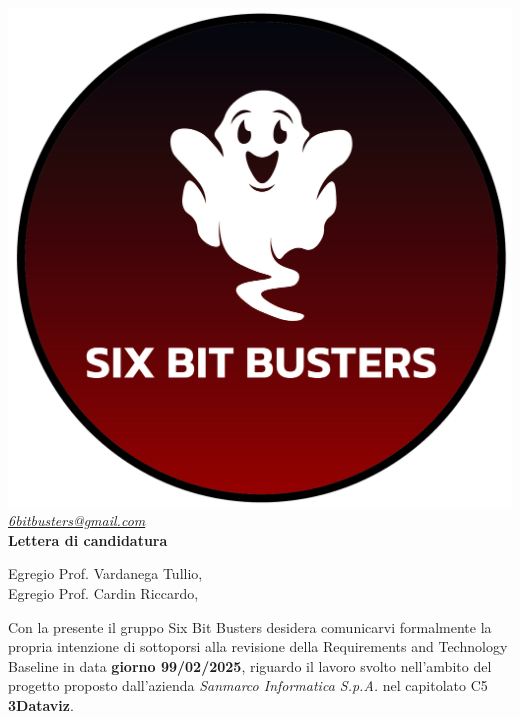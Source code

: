 \thispagestyle{empty}
\renewcommand{\arraystretch}{1.0}


\begin{titlepage}
	\begin{center}
	    
	
		
	\includegraphics[scale = 0.5]{template/images/logo-circle.png}
	\\[1cm]
	\href{mailto:6bitbusters@gmail.com}		      	
	{\large{\textit{6bitbusters@gmail.com} } }\\[1cm]
	
	{\Huge{ \textbf{Lettera di candidatura} } }\\[1cm]
        \end{center}
        Egregio Prof. Vardanega Tullio, \\
        Egregio Prof. Cardin Riccardo,
        \newline

        Con la presente il gruppo Six Bit Busters desidera comunicarvi formalmente la propria
        intenzione di sottoporsi alla revisione della Requirements and Technology Baseline in data \textbf{giorno 99/02/2025}, riguardo il lavoro svolto nell'ambito del progetto proposto dall'azienda \textit{Sanmarco Informatica S.p.A.}
        nel capitolato C5 \textbf{3Dataviz}.\\


\end{titlepage}

